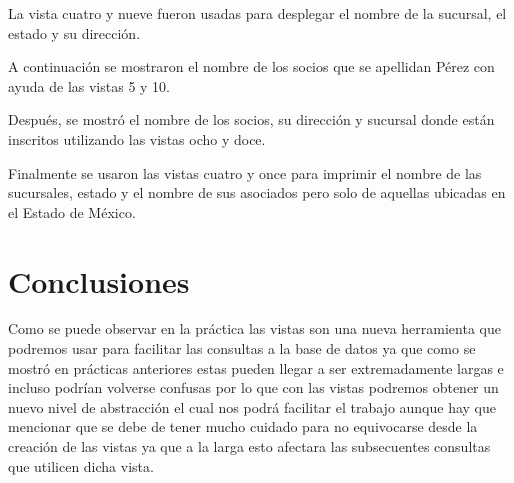 \documentclass[12pt, titlepage]{article}
\begin{document}
	La vista cuatro y nueve fueron usadas para desplegar el nombre de la sucursal, el estado y su dirección.
	
	A continuación se mostraron el nombre de los socios que se apellidan Pérez con ayuda de las vistas 5 y 10.
	 
	Después, se mostró el nombre de los socios, su dirección y sucursal donde están inscritos utilizando las vistas ocho y doce.
	
	Finalmente se usaron las vistas cuatro y once para imprimir el nombre de las sucursales, estado y el nombre de sus asociados pero solo de aquellas ubicadas en el Estado de México.
	
	
	\section{Conclusiones}
	Como se puede observar en la práctica las vistas son una nueva herramienta que podremos usar para facilitar las consultas a la base de datos ya que como se mostró en prácticas anteriores estas pueden llegar a ser extremadamente largas e incluso podrían volverse confusas por lo que con las vistas podremos obtener un nuevo nivel de abstracción el cual nos podrá facilitar el trabajo aunque hay que mencionar que se debe de tener mucho cuidado para no equivocarse desde la creación de las vistas ya que a la larga esto afectara las subsecuentes consultas que utilicen dicha vista.
	 
	
\end{document}
